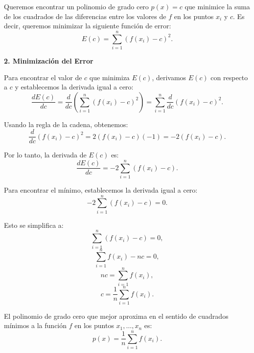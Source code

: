 \documentclass{article}
\begin{document}
Queremos encontrar un polinomio de grado cero \( p(x) = c \) que minimice la suma de los cuadrados de las diferencias entre los valores de \( f \) en los puntos \( x_i \) y \( c \). Es decir, queremos minimizar la siguiente función de error:
\[
E(c) = \sum_{i=1}^n (f(x_i) - c)^2.
\]
\begin{center}
    \textbf{2. Minimización del Error}    
\end{center}


Para encontrar el valor de \( c \) que minimiza \( E(c) \), derivamos \( E(c) \) con respecto a \( c \) y establecemos la derivada igual a cero:
\[
\frac{dE(c)}{dc} = \frac{d}{dc} \left( \sum_{i=1}^n (f(x_i) - c)^2 \right) = \sum_{i=1}^n \frac{d}{dc} (f(x_i) - c)^2.
\]

Usando la regla de la cadena, obtenemos:
\[
\frac{d}{dc} (f(x_i) - c)^2 = 2 (f(x_i) - c)(-1) = -2 (f(x_i) - c).
\]

Por lo tanto, la derivada de \( E(c) \) es:
\[
\frac{dE(c)}{dc} = -2 \sum_{i=1}^n (f(x_i) - c).
\]

Para encontrar el mínimo, establecemos la derivada igual a cero:
\[
-2 \sum_{i=1}^n (f(x_i) - c) = 0.
\]

Esto se simplifica a:
\[
\sum_{i=1}^n (f(x_i) - c) = 0,
\]
\[
\sum_{i=1}^n f(x_i) - n c = 0,
\]
\[
n c = \sum_{i=1}^n f(x_i),
\]
\[
c = \frac{1}{n} \sum_{i=1}^n f(x_i).
\]

El polinomio de grado cero que mejor aproxima en el sentido de cuadrados mínimos a la función \( f \) en los puntos \( x_1, \ldots, x_n \) es:
\[
p(x) = \frac{1}{n} \sum_{i=1}^n f(x_i).
\]
\end{document}

